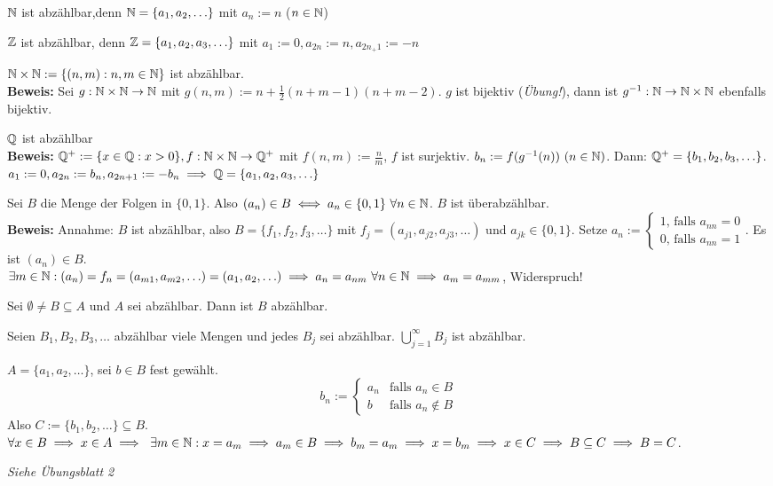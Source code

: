 \documentclass[a4paper,twoside,DIV15,BCOR12mm]{scrbook}
\begin{document}
\begin{beispiele}
\item $\mathbb{N}$ ist abzählbar,denn $\mathbb{N} = \{a_1,a_2,\ldots\}$ mit $a_n := n$ ($n\in \mathbb{N}$)
\item $\mathbb{Z}$ ist abzählbar, denn $\mathbb{Z} = \{a_1,a_2,a_3,\ldots\}$ mit $a_1:= 0, a_{2n} := n, a_{2n_+1} := -n$
\item $\mathbb{N}\times\mathbb{N} := \{(n,m): n,m \in \mathbb{N}\}$ ist abzählbar.\\
\textbf{Beweis:} Sei $g: \mathbb{N}\times\mathbb{N} \rightarrow \mathbb{N}$ mit $g(n,m) := n+\frac{1}{2}(n+m-1)(n+m-2)$. $g$ ist bijektiv (\textit{Übung!}), dann ist $g^{-1}: \mathbb{N} \rightarrow \mathbb{N}\times\mathbb{N}$ ebenfalls bijektiv.
\item $\mathbb{Q}$ ist abzählbar\\
\textbf{Beweis:} $\mathbb{Q}^+ := \{x \in \mathbb{Q}: x>0\}, f:\mathbb{N}\times\mathbb{N} \rightarrow \mathbb{Q}^+$ mit $f(n,m) := \frac{n}{m}$, $f$ ist surjektiv. $b_n := f(g^{-1}(n))\ (n\in\MdN)$. Dann: $\mathbb{Q}^+ = \{b_1, b_2, b_3,\ldots\}$. $a_1:= 0, a_{2n} := b_n, a_{2n+1} := -b_n \implies \mathbb{Q} = \{a_1,a_2,a_3,\ldots\}$
\item Sei $B$ die Menge der Folgen in $\{0,1\}$. Also $(a_n)\in B \equizu a_n \in \{0,1\} \ \forall n \in \MdN$. $B$ ist überabzählbar.\\
\textbf{Beweis:} Annahme: $B$ ist abzählbar, also $B=\{f_1,f_2,f_3,\ldots\}$ mit $f_j = (a_{j1}, a_{j2}, a_{j3},\ldots)$ und $a_{jk} \in \{0,1\}$. Setze $a_n := \begin{cases}1\mbox{, falls } a_{nn} = 0 \\ 0\mbox{, falls }a_{nn} = 1\end{cases}$. Es ist $(a_n) \in B$. \\
$\exists m \in \mathbb{N}: (a_n) = f_n = (a_{m1}, a_{m2}, \ldots) = (a_1,a_2,\ldots) \implies a_n = a_{nm}\ \forall n \in \mathbb{N} \implies a_m = a_{mm}$, Widerspruch!
\end{beispiele}

\begin{satz*}
\begin{liste}
\item Sei $\emptyset \ne B \subseteq A$ und $A$ sei abzählbar. Dann ist $B$ abzählbar.
\item Seien $B_1, B_2, B_3, \ldots$ abzählbar viele Mengen und jedes $B_j$ sei abzählbar. $\displaystyle \bigcup_{j=1}^\infty B_j$ ist abzählbar.
\end{liste}
\end{satz*}

\begin{beweise}
\item $A = \{a_1,a_2,\ldots\}$, sei $b \in B$ fest gewählt.
$$ b_n := \begin{cases} a_n & \mbox{falls } a_n \in B \\ b & \mbox{falls } a_n \notin B \end{cases}$$
Also $C:=\{b_1,b_2,\ldots\} \subseteq B$. $\forall x \in B \folgt x \in A \folgt \ \exists m \in \MdN: x = a_m \folgt a_m \in B \folgt b_m = a_m \folgt x=b_m \folgt x \in C \folgt B \subseteq C \folgt B = C$.
\item \textit{Siehe Übungsblatt 2}
\end{beweise}
\end{document}
